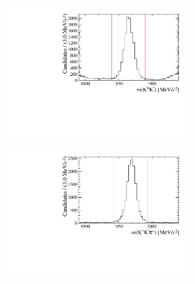 \begin{figure}[!h]
   \centering
   \begin{subfigure}[t]{1.0\textwidth}
   \centering
     \begin{subfigure}[t]{0.35\textwidth}
        \centering
        \includegraphics[width=1.0\textwidth]{figs/Selection/Phimass_KKPi_B2DsD0.pdf}
     \end{subfigure}
     \begin{subfigure}[t]{0.35\textwidth}
        \centering
        \includegraphics[width=1.0\textwidth]{figs/Selection/Dmass_KKPi_B2DsD0.pdf}
     \end{subfigure}
     \caption{\decay{\Bp}{(\decay{\Dsp}{\Kp\Km\pip})\Dzb}}

\end{subfigure}
\end{figure}
